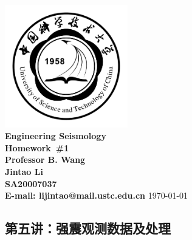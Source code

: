 \documentclass{article}
\makeatletter
\newcommand{\hmwkTitle}{Homework\ \#1}
\newcommand{\hmwkClass}{Engineering Seismology}
\newcommand{\hmwkClassInstructor}{Professor B. Wang}
\newcommand{\hmwkAuthorName}{\textbf{Jintao Li}}
\newcommand{\hmwkAuthorID}{\textbf{SA20007037}}
\newcommand{\hmwkAuthoremail}{\textbf{E-mail: lijintao@mail.ustc.edu.cn}}
\makeatother
\begin{document}
\begin{titlepage}

\begin{center}

\textcolor{ustcblue}{\includegraphics[width=0.4\textwidth]{./ustc_logo_fig.pdf} \\ [1cm]}
{ \Huge \bfseries \hmwkClass}\\[1cm]
{\Huge \bfseries \hmwkTitle} \\[1cm]

\large \textbf{\hmwkClassInstructor} \\ [5cm]

\large \hmwkAuthorName \\ [0.25cm]
\large \hmwkAuthorID \\ [0.25cm]
\large \hmwkAuthoremail
\vfill
{\large \today}

\end{center}

\end{titlepage}

\begin{center}
\section{第五讲：强震观测数据及处理}
\end{center}
\end{document}
